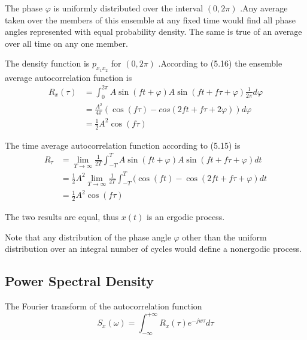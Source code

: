 	     The phase $\varphi$ is uniformly distributed over the interval $(0,2\pi)$ .Any average taken over the members of this ensemble at any fixed time would find all phase angles represented with equal probability density. The same is true of an average over all time on any one member.
	     
	      The density function is $ p_{x_{1}x_{2}}$ for $(0,2\pi)$ .According to (5.16) the ensemble average autocorrelation function is
	     \begin{equation*}
	     \begin{aligned}
	      R_{x}(\tau)&=\int_{0}^{2\pi}A\sin(ft+\varphi) A\sin(ft+f\tau+\varphi) \frac{1}{2\pi}d\varphi\\
	      & =\frac{A^{2}}{4\pi}(\cos(f\tau)-cos(2ft+f\tau+2\varphi))d\varphi\\
	      & =\frac{1}{2}A^{2}\cos(f\tau)
	     \end{aligned}
	     \end{equation*}
	       
	      	
	      	The time average autocorrelation function according to (5.15) is 
	      	\begin{equation*}
	      	\begin{aligned}
	        R_{\tau}&=\lim_{T\longrightarrow\infty}\frac{1}{2T}\int_{-T}^{T}A\sin(ft+\varphi)A\sin(ft+f\tau+\varphi)dt \\
	        &=\frac{1}{2}A^{2}\lim_{T\longrightarrow\infty}\frac{1}{2T}\int_{-T}^{T}(\cos(ft)-\cos(2ft+f\tau+\varphi)dt\\
	        & =\frac{1}{2}A^{2}\cos(f\tau)
	      	\end{aligned}
	      	\end{equation*}
	      	
	      	 
	      	
	      	The two results are equal, thus  $x(t)$ is an ergodic process. 
	      	
	      	Note that any distribution of the phase angle $\varphi$ other than the uniform distribution over an integral number of cycles would define a nonergodic process.
	      	
	      	 \subsection { Power Spectral Density} 
	      	 
	      	 The Fourier transform of the autocorrelation function
	      	 \begin{equation}\label{5.17}
	      	  S_{x}(\omega)=\int_{-\infty}^{+\infty}R_{x}(\tau)e^{-jw\tau}d\tau
	      	 \end{equation}
	      	 
